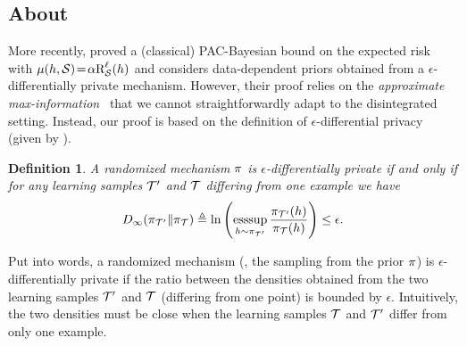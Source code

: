 \documentclass[twoside]{article}
\theoremstyle{plain}
\newtheorem{definition}[theorem]{Definition}
\begin{document}
\subsection[About Equation (9)]{About }
\label{sec:comparison-dziugaite}

More recently, \citet[Theorem 4.2]{dziugaite2018data} proved a (classical) PAC-Bayesian bound on the expected risk with $\comp(h,\Scal)\!=\!\alpha\RiskLoss_{\Scal}(h)$ and considers data-dependent priors obtained from a $\epsilon$-differentially private mechanism.
However, their proof relies on the \textit{approximate max-information}~\citep{dwork2015generalization} that we cannot straightforwardly adapt to the disintegrated setting.
Instead, our proof is based on the definition of $\epsilon$-differential privacy (given by \citet[Section III]{mironov2017renyi}).

\begin{definition}\label{def:differentially-private}
A randomized mechanism $\P$ is $\epsilon$-differentially private if and only if for any learning samples $\Tcal'$ and $\Tcal$ differing from one example we have
\begin{align*}
D_{\infty}(\P_{\Tcal'}\|\P_{\Tcal}) \defeq \ln\LP\esssup_{h\sim \P_{\Tcal'}}\frac{\P_{\Tcal'}(h)}{\P_{\Tcal}(h)}\RP \le \epsilon.
\end{align*}
\end{definition}

Put into words, a randomized mechanism (\ie, the sampling from the prior $\P$) is $\epsilon$-differentially private if the ratio between the densities obtained from the two learning samples $\Tcal'$ and $\Tcal$ (differing from one point) is bounded by $\epsilon$.
Intuitively, the two densities must be close when the learning samples $\Tcal$ and $\Tcal'$ differ from only one example. 
\end{document}

